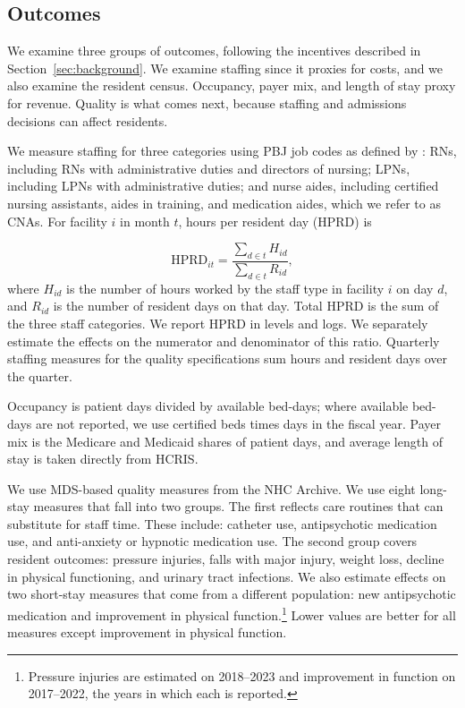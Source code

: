 \documentclass[12pt]{article}
\begin{document}
\subsection{Outcomes}

We examine three groups of outcomes, following the incentives described in Section~\ref{sec:background}. We examine staffing since it proxies for costs, and we also examine the resident census. Occupancy, payer mix, and length of stay proxy for revenue. Quality is what comes next, because staffing and admissions decisions can affect residents.

We measure staffing for three categories using PBJ job codes as defined by \citet{cms_fivestar_2026}: RNs, including RNs with administrative duties and directors of nursing; LPNs, including LPNs with administrative duties; and nurse aides, including certified nursing assistants, aides in training, and medication aides, which we refer to as CNAs. For facility \(i\) in month \(t\), hours per resident day (HPRD) is

\begin{equation}
  \label{eq:hprd}
  \text{HPRD}_{it}
  =
  \frac{\displaystyle\sum_{d \in t} H_{id}}
       {\displaystyle\sum_{d \in t} R_{id}},
\end{equation}
where \(H_{id}\) is the number of hours worked by the staff type in facility \(i\) on day \(d\), and \(R_{id}\) is the number of resident days on that day. Total HPRD is the sum of the three staff categories. We report HPRD in levels and logs. We separately estimate the effects on the numerator and denominator of this ratio. Quarterly staffing measures for the quality specifications sum hours and resident days over the quarter.

Occupancy is patient days divided by available bed-days; where available bed-days are not reported, we use certified beds times days in the fiscal year. Payer mix is the Medicare and Medicaid shares of patient days, and average length of stay is taken directly from HCRIS.

We use MDS-based quality measures from the NHC Archive. We use eight long-stay measures that fall into two groups. The first reflects care routines that can substitute for staff time. These include: catheter use, antipsychotic medication use, and anti-anxiety or hypnotic medication use. The second group covers resident outcomes: pressure injuries, falls with major injury, weight loss, decline in physical functioning, and urinary tract infections. We also estimate effects on two short-stay measures that come from a different population: new antipsychotic medication and improvement in physical function.\footnote{Pressure injuries are estimated on 2018–2023 and improvement in function on 2017–2022, the years in which each is reported.} Lower values are better for all measures except improvement in physical function.
\end{document}
